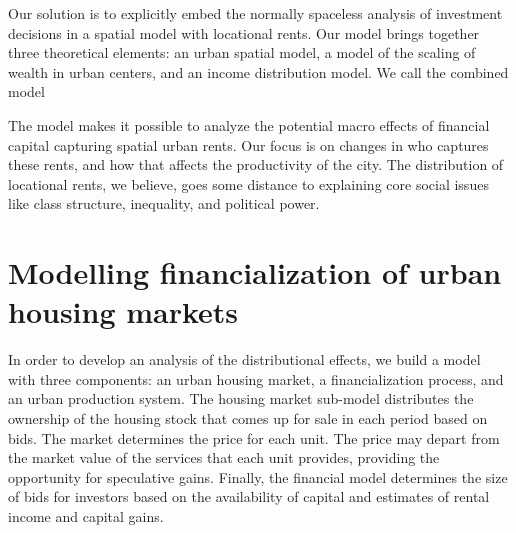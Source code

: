  Our solution is to explicitly embed the normally spaceless analysis of investment decisions in a spatial model with locational rents. 
 Our model brings together three theoretical elements: an urban spatial model,  a model of the scaling of wealth in urban centers, and an income distribution model. %
 {\color{red}We call the combined model }

The model makes it possible to analyze the potential macro effects of financial capital capturing spatial urban rents. Our focus is on changes in who captures these rents, and how that affects the productivity of the city. The distribution of locational rents, we believe, goes some distance to explaining core social issues like class structure, inequality, and political power.

\section{Modelling financialization of urban housing markets}
In order to develop an analysis of the distributional effects, we build a model with three components: an urban housing market, a financialization process, and an urban production system. The housing market sub-model distributes the ownership of the housing stock that comes up for sale in each period based on bids. %
The market determines the price for each unit. The price may depart from the market value of the services that each unit provides, providing the opportunity for speculative gains. Finally, the financial model determines the size of bids for investors based on the availability of capital and estimates of rental income and capital gains.


